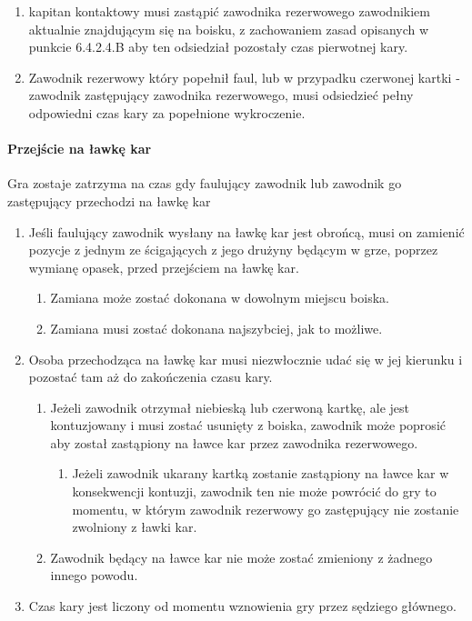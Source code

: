 \documentclass[12pt]{article}
\begin{document}
\begin{enumerate}
\begin{enumerate}
    \begin{enumerate}
    \item
            kapitan kontaktowy musi zastąpić zawodnika rezerwowego zawodnikiem
      aktualnie znajdującym się na boisku, z zachowaniem zasad opisanych
      w punkcie 6.4.2.4.B aby ten odsiedział pozostały czas pierwotnej
      kary.
          \item
            Zawodnik rezerwowy który popełnił faul, lub w przypadku czerwonej
      kartki - zawodnik zastępujący zawodnika rezerwowego, musi
      odsiedzieć pełny odpowiedni czas kary za popełnione wykroczenie.
          \end{enumerate}
  \end{enumerate}
\end{enumerate}

\paragraph{Przejście na ławkę kar}
Gra zostaje zatrzyma na czas
gdy faulujący zawodnik lub zawodnik go zastępujący przechodzi na ławkę
kar

\begin{enumerate}
\item
    Jeśli faulujący zawodnik wysłany na ławkę kar jest obrońcą, musi on
  zamienić pozycje z jednym ze ścigających z jego drużyny będącym w
  grze, poprzez wymianę opasek, przed przejściem na ławkę kar.
  
  \begin{enumerate}
  \item
        Zamiana może zostać dokonana w dowolnym miejscu boiska.
      \item
        Zamiana musi zostać dokonana najszybciej, jak to możliwe.
      \end{enumerate}
\item
    Osoba przechodząca na ławkę kar musi niezwłocznie udać się w jej
  kierunku i pozostać tam aż do zakończenia czasu kary.
  
  \begin{enumerate}
  \item
        Jeżeli zawodnik otrzymał niebieską lub czerwoną kartkę, ale jest
    kontuzjowany i musi zostać usunięty z boiska, zawodnik może poprosić
    aby został zastąpiony na ławce kar przez zawodnika rezerwowego.
    
    \begin{enumerate}
    \item
            Jeżeli zawodnik ukarany kartką zostanie zastąpiony na ławce kar w
      konsekwencji kontuzji, zawodnik ten nie może powrócić do gry to
      momentu, w którym zawodnik rezerwowy go zastępujący nie zostanie
      zwolniony z ławki kar.
          \end{enumerate}
  \item
        Zawodnik będący na ławce kar nie może zostać zmieniony z żadnego
    innego powodu.
      \end{enumerate}
\item
    Czas kary jest liczony od momentu wznowienia gry przez sędziego
  głównego.
  \end{enumerate}
\end{document}
